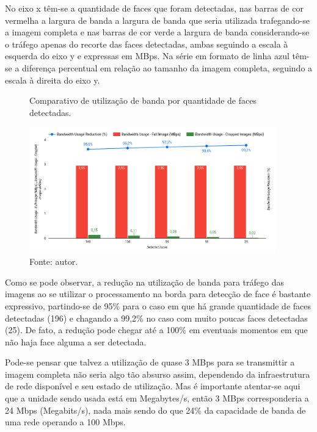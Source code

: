 No eixo x têm-se a quantidade de faces que foram detectadas, nas barras de cor vermelha a largura de banda a largura de banda que seria utilizada trafegando-se a imagem completa e nas barras de cor verde a largura de banda considerando-se o tráfego apenas do recorte das faces detectadas, ambas seguindo a escala à esquerda do eixo y e expressas em MBps. Na série em formato de linha azul têm-se a diferença percentual em relação ao tamanho da imagem completa, seguindo a escala à direita do eixo y.

\begin{figure}
    \centering
    \caption[Comparativo de utilização de banda por quantidade de faces detectadas.]{Comparativo de utilização de banda por quantidade de faces detectadas.}
    \includegraphics[width=0.95\textwidth]{Cap4_Experimentos_Realizados/Figures/cena1_comparativo_utilizacao_banda.jpg}
    \caption*{Fonte: autor.}
    \label{fig:cena1_comparativo_utilizacao_banda}
\end{figure}

Como se pode observar, a redução na utilização de banda para tráfego das imagens ao se utilizar o processamento na borda para detecção de face é bastante expressivo, partindo-se de 95\% para o caso em que há grande quantidade de faces detectadas (196) e chagando a 99,2\% no caso com muito poucas faces detectadas (25). De fato, a redução pode chegar até a 100\% em eventuais momentos em que não haja face alguma a ser detectada.

Pode-se pensar que talvez a utilização de quase 3 MBps para se transmittir a imagem completa não seria algo tão absurso assim, dependendo da infraestrutura de rede disponível e seu estado de utilização. Mas é importante atentar-se aqui que a unidade sendo usada está em Megabytes/s, então 3 MBps corresponderia a 24 Mbps (Megabits/s), nada mais sendo do que 24\% da capacidade de banda de uma rede operando a 100 Mbps.

